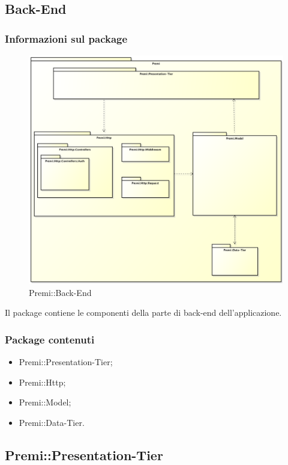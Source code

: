 \subsection{Back-End}
	\subsubsection*{Informazioni sul package}
		\begin{figure}[h]
			\centering
			\includegraphics[width=0.9\linewidth]{img/back-end_package}
			\caption[Premi::Back-End]{Premi::Back-End}
		\end{figure}
		Il package contiene le componenti della parte di \gls{back-end} dell'applicazione.
		
	\subsubsection*{Package contenuti}
		\begin{itemize}
			\item Premi::Presentation-Tier;
			\item Premi::Http;
			\item Premi::Model;
			\item Premi::Data-Tier.
		\end{itemize}

\newpage

\subsection{Premi::Presentation-Tier}
